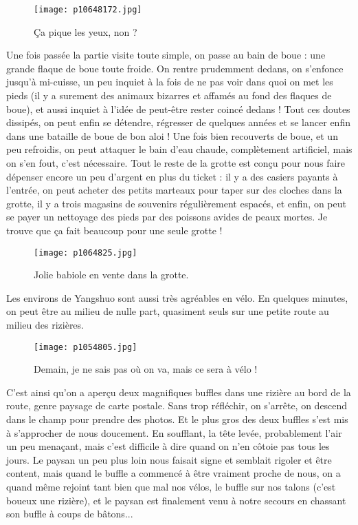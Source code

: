 \documentclass{book}
\begin{document}
\begin{figure}[h]
\centering
\texttt{[image: p10648172.jpg]}
\caption*{Ça pique les yeux, non ?}
\end{figure}

Une fois passée la partie visite toute simple, on passe au bain de boue : une grande flaque de boue toute froide. On rentre prudemment dedans, on s'enfonce jusqu'à mi-cuisse, un peu inquiet à la fois de ne pas voir dans quoi on met les pieds (il y a surement des animaux bizarres et affamés au fond des flaques de boue), et aussi inquiet à l'idée de peut-être rester coincé dedans ! Tout ces doutes dissipés, on peut enfin se détendre, régresser de quelques années et se lancer enfin dans une bataille de boue de bon aloi ! Une fois bien recouverts de boue, et un peu refroidis, on peut attaquer le bain d'eau chaude, complètement artificiel, mais on s'en fout, c'est nécessaire. Tout le reste de la grotte est conçu pour nous faire dépenser encore un peu d'argent en plus du ticket : il y a des casiers payants à l'entrée, on peut acheter des petits marteaux pour taper sur des cloches dans la grotte, il y a trois magasins de souvenirs régulièrement espacés, et enfin, on peut se payer un nettoyage des pieds par des poissons avides de peaux mortes. Je trouve que ça fait beaucoup pour une seule grotte !


\begin{figure}[h]
\centering
\texttt{[image: p1064825.jpg]}
\caption*{Jolie babiole en vente dans la grotte.}
\end{figure}

Les environs de Yangshuo sont aussi très agréables en vélo. En quelques minutes, on peut être au milieu de nulle part, quasiment seuls sur une petite route au milieu des rizières.


\begin{figure}[h]
\centering
\texttt{[image: p1054805.jpg]}
\caption*{Demain, je ne sais pas où on va, mais ce sera à vélo !}
\end{figure}

C'est ainsi qu'on a aperçu deux magnifiques buffles dans une rizière au bord de la route, genre paysage de carte postale. Sans trop réfléchir, on s'arrête, on descend dans le champ pour prendre des photos. Et le plus gros des deux buffles s'est mis à s'approcher de nous doucement. En soufflant, la tête levée, probablement l'air un peu menaçant, mais c'est difficile à dire quand on n'en côtoie pas tous les jours. Le paysan un peu plus loin nous faisait signe et semblait rigoler et être content, mais quand le buffle a commencé à être vraiment proche de nous, on a quand même rejoint tant bien que mal nos vélos, le buffle sur nos talons (c'est boueux une rizière), et le paysan est finalement venu à notre secours en chassant son buffle à coups de bâtons...
\end{document}
